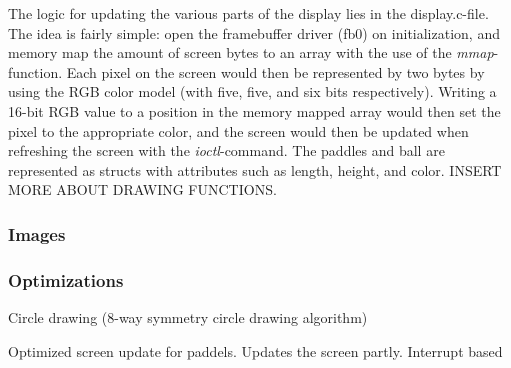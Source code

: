 The logic for updating the various parts of the display lies in the display.c-file. The idea is fairly simple: open the framebuffer driver (fb0) on initialization, and memory map the amount of screen bytes to an array with the use of the \emph{mmap}-function. Each pixel on the screen would then be represented by two bytes by using the RGB color model (with five, five, and six bits respectively). Writing a 16-bit RGB value to a position in the memory mapped array would then set the pixel to the appropriate color, and the screen would then be updated when refreshing the screen with the \emph{ioctl}-command. The paddles and ball are represented as structs with attributes such as length, height, and color. INSERT MORE ABOUT DRAWING FUNCTIONS.

\subsubsection{Images}




\subsubsection{Optimizations}

Circle drawing (8-way symmetry circle drawing algorithm)

Optimized screen update for paddels. Updates the screen partly. Interrupt based 
